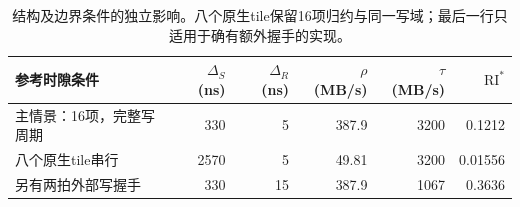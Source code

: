 \begin{table}[htbp]\centering\small
\begin{tabular}{@{}lrrrrr@{}}\toprule
参考时隙条件 & $\Delta_S$ (ns) & $\Delta_R$ (ns) & $\rho$ (MB/s) & $\tau$ (MB/s) & $\mathrm{RI}^{*}$\\\midrule
主情景：16项，完整写周期 & 330 & 5 & 387.9 & 3200 & 0.1212\\
八个原生tile串行 & 2570 & 5 & 49.81 & 3200 & 0.01556\\
另有两拍外部写握手 & 330 & 15 & 387.9 & 1067 & 0.3636\\
\bottomrule\end{tabular}
\caption{结构及边界条件的独立影响。八个原生tile保留16项归约与同一写域；最后一行只适用于确有额外握手的实现。}\label{02_sram_dcim:tab:dcim-sensitivity}\end{table}
